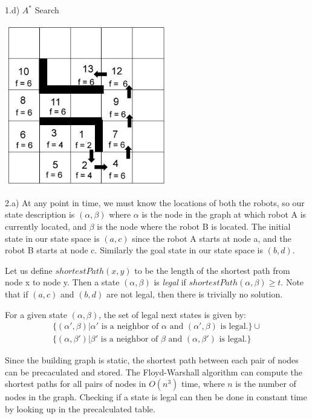 \documentclass[11pt]{article}
\begin{document}
\newpage

1.d) $A^*$ Search

{\center \includegraphics[width=200pt,height=200pt]{q1-astar.jpg} }

\newpage

2.a) At any point in time, we must know the locations of both the robots, so
our state description is $(\alpha,\beta)$ where $\alpha$ is the node in the
graph at which robot A is currently located, and $\beta$ is the node where
the robot B is located. The initial state in our state space is $(a,c)$ since
the robot A starts at node a, and the robot B starts at node c. Similarly the
goal state in our state space is $(b,d)$.

Let us define $shortestPath(x,y)$ to be the length of the shortest path from
node x to node y. Then a state $(\alpha,\beta)$ is {\it legal} if
$shortestPath(\alpha,\beta) \geq t$. Note that if $(a,c)$ and $(b,d)$ are not
legal, then there is trivially no solution.

For a given state $(\alpha,\beta)$, the set of legal next states is given by:
\begin{align*}
    \{ (\alpha',\beta) | \alpha' \text{ is a neighbor of } \alpha \text{ and } (\alpha',\beta) \text{ is legal.} \}
    \cup \\
    \{ (\alpha,\beta') | \beta'  \text{ is a neighbor of } \beta  \text{ and } (\alpha,\beta') \text{ is legal.} \}
\end{align*}

Since the building graph is static, the shortest path between each pair of nodes
can be precaculated and stored. The Floyd-Warshall algorithm can compute the
shortest paths for all pairs of nodes in $O(n^3)$ time, where $n$ is the number
of nodes in the graph. Checking if a state is legal can then be done in constant
time by looking up in the precalculated table.
\end{document}
